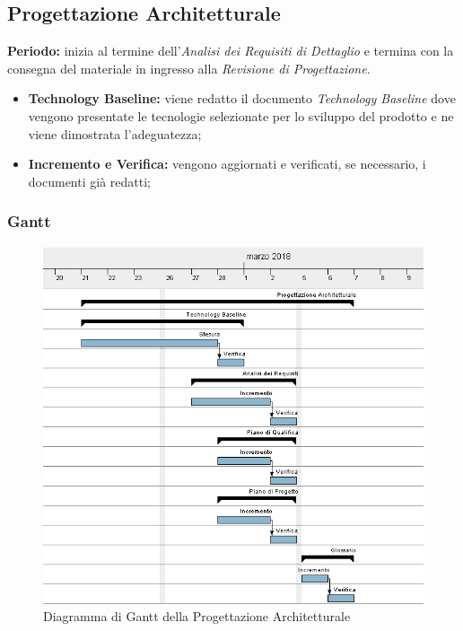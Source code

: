 \subsection{Progettazione Architetturale}
    \textbf{Periodo:}
    inizia al termine dell'\emph{Analisi dei Requisiti di Dettaglio} e termina con la consegna del materiale in ingresso alla \emph{Revisione di Progettazione}.
    \begin{itemize}
    	\item \textbf{Technology Baseline:} viene redatto il documento \emph{Technology Baseline} dove vengono presentate le tecnologie selezionate per lo sviluppo del prodotto e ne viene dimostrata l'adeguatezza;
    	\item \textbf{Incremento e Verifica:} vengono aggiornati e verificati, se necessario, i documenti già redatti;
    \end{itemize}
\subsubsection{Gantt}
\begin{figure}[h!]
	\centering 
	\includegraphics[width=1\textwidth]{images/Progettazione-Architetturale.png}
	\caption{Diagramma di Gantt della Progettazione Architetturale}
	\label{graficobello3} 
\end{figure}
